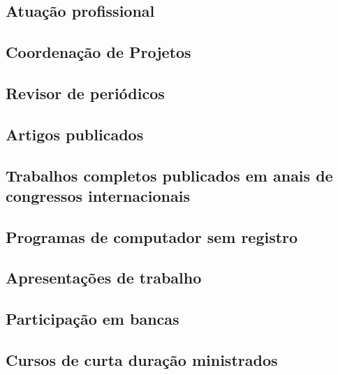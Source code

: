 \subsection{Atuação profissional}





\subsection{Coordenação de Projetos}





\subsection{Revisor de periódicos}



\subsection{Artigos publicados}





\subsection{Trabalhos completos publicados em anais de congressos internacionais}


\subsection{Programas de computador sem registro}


\subsection{Apresentações de trabalho}


\subsection{Participação em bancas}


\subsection{Cursos de curta duração ministrados}



%
